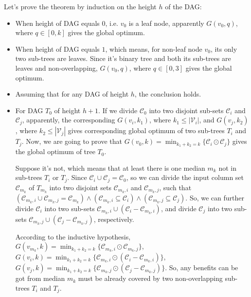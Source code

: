 \begin{IEEEproof}
Let's prove the theorem by induction on the height $h$ of the {DAG}:

\begin{itemize}
\item When height of {DAG} equals $0$, i.e. $v_0$ is a leaf node, apparently
$G(v_0, q)$, where $q \in [0, k]$ gives the global optimum.

\item When height of {DAG} equals $1$, which means, for non-leaf node $v_0$,
its only two sub-trees are leaves. Since it's binary tree and both its
sub-trees are leaves and non-overlapping, $G(v_0, q)$,
where $q \in [0, 3]$ gives the global optimum.

\item Assuming that for any {DAG} of height $h$, the conclusion holds.

\item For {DAG} $T_0$ of height $h+1$. If we divide $\mathcal{C}_0$ into
two disjoint sub-sets $\mathcal{C}_i$ and $\mathcal{C}_j$, apparently,
the corresponding $G(v_i, k_1)$, where $k_1 \leq |\mathcal{V}_i|$, 
and $G(v_j, k_2)$, where $k_2 \leq |\mathcal{V}_j|$ gives corresponding 
global optimum of two sub-trees $T_i$ and $T_j$. Now, we are going to 
prove that $G(v_0, k) = \min_{k_1 + k_2 = k}\{ \mathcal{C}_i \odot \mathcal{C}_j \}$ gives the global optimum of tree $T_0$. 

        Suppose it's not, which means that at least there is one median
        $m_k$ not in sub-trees $T_i$ or $T_j$. Since $\mathcal{C}_i \cup \mathcal{C}_j = \mathcal{C}_0$, so we can divide the input column set $\mathcal{C}_{m_k}$ of $T_{m_k}$ into two disjoint sets $\mathcal{C}_{m_k, i}$ and $\mathcal{C}_{m_k, j}$,
        such that $(\mathcal{C}_{m_k, i} \cup \mathcal{C}_{m_k, j} = \mathcal{C}_{m_k}) \wedge (\mathcal{C}_{m_k, i} \subseteq \mathcal{C}_i) \wedge (\mathcal{C}_{m_k, j} \subseteq \mathcal{C}_j)$. So, we can further divide $\mathcal{C}_i$
        into two sub-sets $\mathcal{C}_{m_k, i} \cup (\mathcal{C}_i - \mathcal{C}_{m_k, i})$, and divide $\mathcal{C}_j$ into two sub-sets $\mathcal{C}_{m_k, j} \cup (\mathcal{C}_j - \mathcal{C}_{m_k, j})$, respectively.

        According to the inductive hypothesis, $G(v_{m_k}, k) = \min_{k_1 + k_2 = k} \{ \mathcal{C}_{m_k, i} \odot \mathcal{C}_{m_k, j}\}$, 
        $G(v_i, k) = \min_{k_1 + k_2 = k}\{\mathcal{C}_{m_k, i} \odot (\mathcal{C}_{i} - \mathcal{C}_{m_k, i})\}$,
        $G(v_j, k) = \min_{k_1 + k_2 = k}\{\mathcal{C}_{m_k, j} \odot (\mathcal{C}_{j} - \mathcal{C}_{m_k, j})\}$.
        So, any benefits can be got from median $m_k$ must be already
        covered by two non-overlapping sub-trees $T_i$ and $T_j$.
\end{itemize}
\end{IEEEproof}
